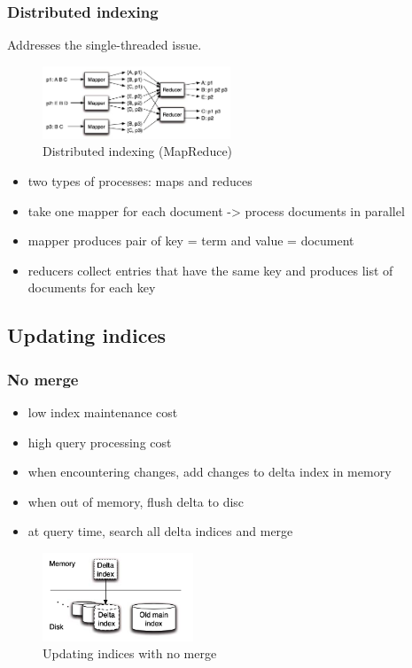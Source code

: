 \subsubsection{Distributed indexing}
Addresses the single-threaded issue.
\begin{figure}[ht]
    \centering
    \includegraphics[width=0.5\textwidth]{figures/map_reduce.png}
    \caption{Distributed indexing (MapReduce)}
\end{figure}
\begin{itemize}
    \item two types of processes: maps and reduces
    \item take one mapper for each document -> process documents in parallel
    \item mapper produces pair of key = term and value = document
    \item reducers collect entries that have the same key and produces list of documents for each key
\end{itemize}

\subsection{Updating indices}
\subsubsection{No merge}
\begin{itemize}
    \item low index maintenance cost
    \item high query processing cost
    \item when encountering changes, add changes to delta index in memory
    \item when out of memory, flush delta to disc
    \item at query time, search all delta indices and merge
\end{itemize}
\begin{figure}[ht]
    \centering
    \includegraphics[width=0.4\textwidth]{figures/index_no_merge.png}
    \caption{Updating indices with no merge}
\end{figure}


